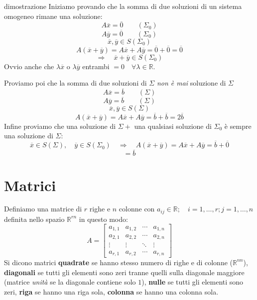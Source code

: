 \documentclass[x11names]{article}
\begin{document}
\begin{es}{dimostrazione}
Iniziamo provando che la somma di due soluzioni di un sistema omogeneo rimane una soluzione:
\[
A \overline{x} = \overline{0} \qquad \left(\Sigma_0\right)
\] 
\[
A \overline{y} = \overline{0} \qquad \left(\Sigma_0\right)
\] 
\[
	\overline{x},\overline{y} \in S\left(\Sigma_0\right)
\] 
\[
A\left(\overline{x} + \overline{y}\right) = A\overline{x} + A\overline{y} = \overline{0} + \overline{0} = \overline{0} 
\] 
\[
\Rightarrow \quad \overline{x} + \overline{y} \in S\left(\Sigma_0\right)
\] 
Ovvio anche che  $\lambda \overline{x}$ o $\lambda \overline{y}$ entrambi $=0 \quad \forall \lambda \in \mathbb{R}$.
 
Proviamo poi che la somma di due soluzioni di $\Sigma$ \textit{non è mai} soluzione di $\Sigma$
\[
A \overline{x} = \overline{b} \qquad \left(\Sigma\right)
\] 
\[
A \overline{y} = \overline{b} \qquad \left(\Sigma\right)
\] 
\[
	\overline{x},\overline{y} \in S\left(\Sigma\right)
\] 
\[
A\left(\overline{x}+\overline{y}\right) = A\overline{x} + A\overline{y} = \overline{b} + \overline{b} = 2\overline{b}
\] 
Infine proviamo che una soluzione di $\Sigma + $  una qualsiasi soluzione di  $\Sigma_{0}$ è sempre una soluzione di $\Sigma$:
 \[
\overline{x} \in S\left(\Sigma\right), \quad \overline{y} \in S\left(\Sigma_0\right) \quad \Rightarrow \quad A\left(\overline{x} + \overline{y}\right) = A\overline{x} + A\overline{y} = \overline{b} + \overline{0}
\] 
\[
 = \overline{b} 
\]
\end{es}








\newpage
\section{Matrici}

Definiamo una matrice di $r$ righe e $n$ colonne con $a_{ij} \in \mathbb{R}; \quad i = 1,\dots,r; j = 1,\dots,n$ definita nello spazio $\mathbb{R}^{rn}$ in questo modo:
$$
A=
\begin{bmatrix}a_{1,1}&a_{1,2}&\cdots &a_{1,n}\\a_{2,1}&a_{2,2}&\cdots &a_{2,n}\\ \vdots &\vdots &\ddots &\vdots \\a_{r,1}&a_{r,2}&\cdots &a_{r,n}\end{bmatrix}
$$
Si dicono matrici \textbf{quadrate} se hanno stesso numero di righe e di colonne ($\mathbb{R}^{nn}$), \textbf{diagonali} se tutti gli elementi sono zeri tranne quelli sulla diagonale maggiore (matrice \textit{unità} se la diagonale contiene solo $1$), \textbf{nulle} se tutti gli elementi sono zeri, \textbf{riga} se hanno una riga sola, \textbf{colonna} se hanno una colonna sola.
\end{document}
